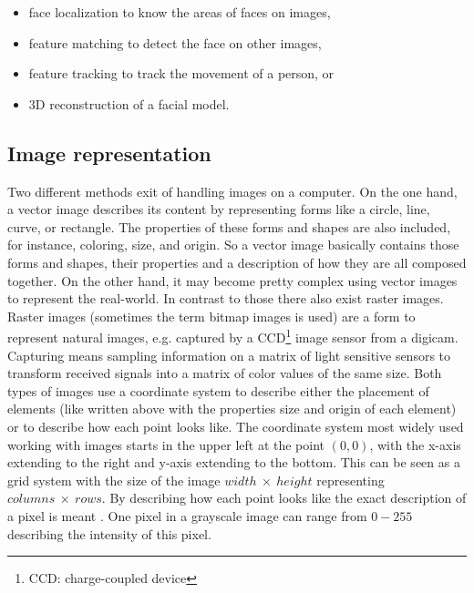 \newpage

\begin{itemize}
  \item face localization to know the areas of faces on images,
  \item feature matching to detect the face on other images,
  \item feature tracking to track the movement of a person, or
  \item 3D reconstruction of a facial model.
\end{itemize}

\subsection*{Image representation}

Two different methods exit of handling images on a computer.
On the one hand, a vector image describes its content by representing forms like a circle, line, curve, or rectangle.
The properties of these forms and shapes are also included, for instance, coloring, size, and origin.
So a vector image basically contains those forms and shapes, their properties and a description of how they are all composed together.
\newline\newline\noindent On the other hand, it may become pretty complex using vector images to represent the real-world.
In contrast to those there also exist raster images.
Raster images (sometimes the term bitmap images is used) are a form to represent natural images, e.g. captured by a CCD\footnote{CCD: charge-coupled device} image sensor from a digicam.
Capturing means sampling information on a matrix of light sensitive sensors to transform received signals into a matrix of color values of the same size.
\newline\newline\noindent Both types of images use a coordinate system to describe either the placement of elements (like written above with the properties size and origin of each element) or to describe how each point looks like.
The coordinate system most widely used working with images starts in the upper left at the point $(0,0)$, with the x-axis extending to the right and y-axis extending to the bottom.
This can be seen as a grid system with the size of the image $width\ \times\ height$ representing $columns\ \times\ rows$.
By describing how each point looks like the exact description of a pixel is meant \citep{shirley2009fundamentals}.
\newline\newline\noindent One pixel in a grayscale image can range from $0 - 255$ describing the intensity of this pixel.

